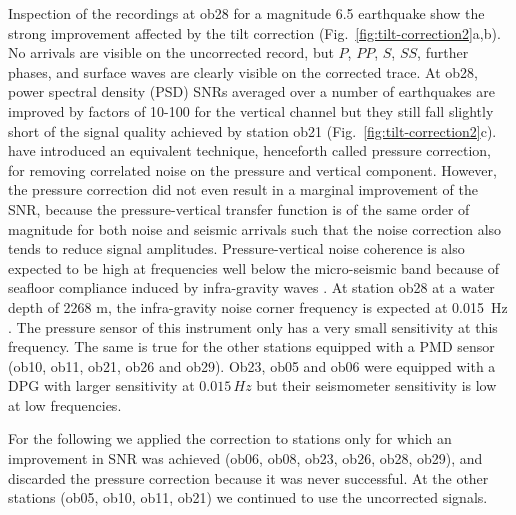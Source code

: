 \documentclass{article}
\begin{document}
{Inspection of the recordings 
at ob28 for a magnitude 6.5 earthquake show the
strong improvement affected by the tilt correction
(Fig.~\ref{fig:tilt-correction2}a,b).  No arrivals are visible on the
uncorrected record, but $P$, $PP$, $S$, $SS$, further phases, and
surface waves are clearly visible on the corrected trace.
At ob28, 
power spectral density (PSD) SNRs 
averaged over a number of earthquakes are improved by factors of
10-100 for the vertical channel but they still fall slightly short of
the signal quality achieved by station ob21  
(Fig.~\ref{fig:tilt-correction2}c). \citet{webb:99} have introduced an
equivalent technique, henceforth called pressure correction, for removing correlated noise on the pressure and
vertical component.
However, the pressure
correction did not even result in a marginal improvement of the SNR,
because the pressure-vertical transfer function is of the same order
of magnitude for both noise and seismic arrivals such
that the noise correction also tends to reduce signal amplitudes.
Pressure-vertical noise coherence is also expected to be high at
frequencies well below the micro-seismic band because of seafloor 
compliance induced by infra-gravity
waves \citep{webb:99}. 
At station ob28 at a water depth of 2268 m, the
infra-gravity noise corner frequency
is expected at 0.015~Hz . 
The pressure sensor of this instrument
only has a very small sensitivity at this frequency.  The same is true
for 
the other stations equipped with a PMD sensor 
(ob10, ob11, ob21, ob26 and ob29).  
Ob23, ob05 and ob06 were equipped with a DPG 
with larger sensitivity at $0.015\, Hz$ but their
seismometer sensitivity is low at low frequencies.  

For the following we applied the correction to stations  only 
for which an improvement in SNR was achieved 
(ob06, ob08, ob23, ob26, ob28, ob29), 
and discarded the pressure correction because it was 
never successful.
At the other stations (ob05, ob10, ob11, ob21)
we continued to use the uncorrected signals.  


}
\end{document}
